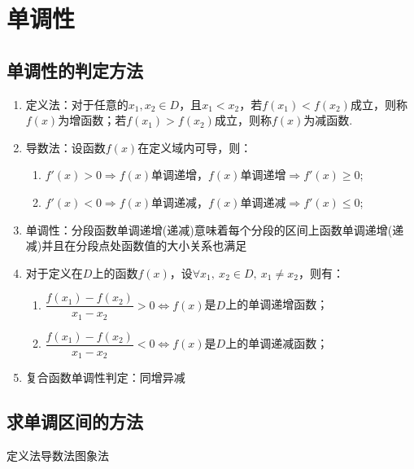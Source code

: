 \documentclass{BHCexam}
\begin{document}
\newpage 



\section{单调性}
\subsection{单调性的判定方法}
\begin{enumerate}[1)]
\item 定义法：对于任意的$ x_1,x_2\in D $，且$ x_1<x_2 $，若$ f(x_1)<f(x_2) $成立，则称$ f(x) $为增函数；若$ f(x_1)>f(x_2) $成立，则称$ f(x) $为减函数.
\item 导数法：设函数$f(x)$在定义域内可导，则：
\begin{enumerate}
\item $ f'(x) >0\Rightarrow f(x)$单调递增，$ f(x) $单调递增$ \Rightarrow f'(x)\ge 0 $;
\item $ f'(x) <0\Rightarrow f(x)$单调递减，$ f(x) $单调递减$ \Rightarrow f'(x)\le 0 $;	
\end{enumerate}
\item {}单调性：分段函数单调递增(递减)意味着每个分段的区间上函数单调递增(递减)并且在分段点处函数值的大小关系也满足 
\item 对于定义在$ D $上的函数$f(x)$，设$\forall x_1,~x_2 \in D,~x_1\ne x_2$，则有：
\begin{enumerate}
\item $\dfrac{f(x_1)-f(x_2)}{x_1-x_2}>0\Leftrightarrow f(x)$是$ D $上的单调递增函数；
\item  $\dfrac{f(x_1)-f(x_2)}{x_1-x_2}<0\Leftrightarrow f(x)$是$ D $上的单调递减函数；
\end{enumerate}
\item 复合函数单调性判定：同增异减
\end{enumerate}
\subsection*{求单调区间的方法}
 定义法\qquad {}导数法\qquad {}图象法
\newpage 
\end{document}
